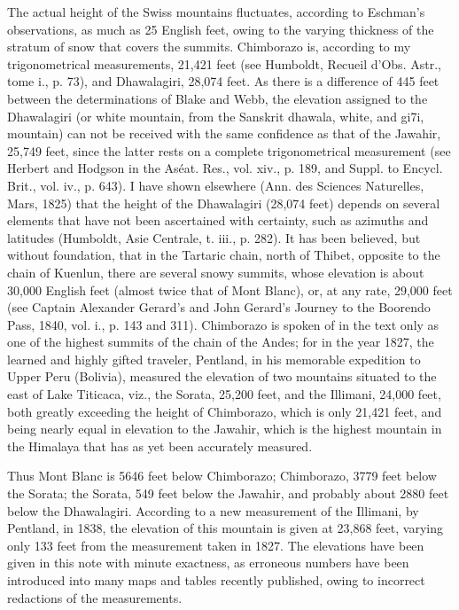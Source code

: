 {The actual height of the Swiss mountains fluctuates, according to Eschman's observations, as much as 25 English feet, owing to the varying thickness of the stratum of snow that covers the summits. Chimborazo is, according to my trigonometrical measurements, 21,421 feet (see Humboldt, Recueil d'Obs. Astr., tome i., p. 73), and Dhawalagiri, 28,074 feet. As there is a difference of 445 feet between the determinations of Blake and Webb, the elevation assigned to the Dhawalagiri (or white mountain, from the Sanskrit dhawala, white, and gi7i, mountain) can not be received with the same confidence as that of the Jawahir, 25,749 feet, since the latter rests on a complete trigonometrical measurement (see Herbert and Hodgson in the As\'{e}at. Res., vol. xiv., p. 189, and Suppl. to Encycl. Brit., vol. iv., p. 643). I have shown elsewhere (Ann. des Sciences Naturelles, Mars, 1825) that the height of the Dhawalagiri (28,074 feet) depends on several elements that have not been ascertained with certainty, such as azimuths and latitudes (Humboldt, Asie Centrale, t. iii., p. 282). It has been believed, but without foundation, that in the Tartaric chain, north of Thibet, opposite to the chain of Kuenlun, there are several snowy summits, whose elevation is about 30,000 English feet (almost twice that of Mont Blanc), or, at any rate, 29,000 feet (see Captain Alexander Gerard's and John Gerard's Journey to the Boorendo Pass, 1840, vol. i., p. 143 and 311). Chimborazo is spoken of in the text only as one of the highest summits of the chain of the Andes; for in the year 1827, the learned and highly gifted traveler, Pentland, in his memorable expedition to Upper Peru (Bolivia), measured the elevation of two mountains situated to the east of Lake Titicaca, viz., the Sorata, 25,200 feet, and the Illimani, 24,000 feet, both greatly exceeding the height of Chimborazo, which is only 21,421 feet, and being nearly equal in elevation to the Jawahir, which is the highest mountain in the Himalaya that has as yet been accurately measured.

Thus Mont Blanc is 5646 feet below Chimborazo; Chimborazo, 3779 feet below the Sorata; the Sorata, 549 feet below the Jawahir, and probably about 2880 feet below the Dhawalagiri. According to a new measurement of the Illimani, by Pentland, in 1838, the elevation of this mountain is given at 23,868 feet, varying only 133 feet from the measurement taken in 1827. The elevations have been given in this note with minute exactness, as erroneous numbers have been introduced into many maps and tables recently published, owing to incorrect redactions of the measurements.

}
